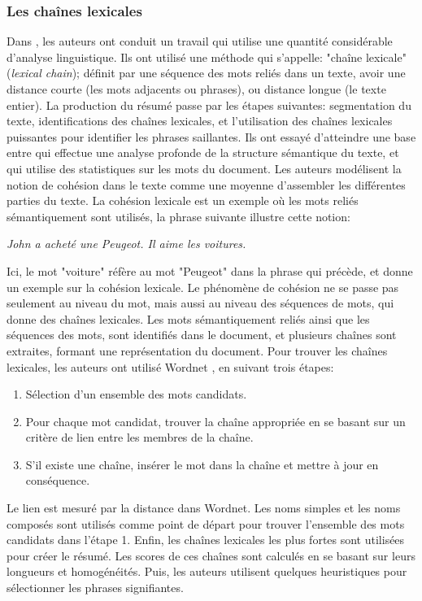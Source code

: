 \documentclass[a4paper,12pt,oneside]{../use/ESIthesis}
\begin{document}
\subsubsection{Les chaînes lexicales}

Dans \cite{97-barzilay-elhadad}, les auteurs ont conduit un travail qui utilise une quantité considérable d'analyse linguistique. 
Ils ont utilisé une méthode qui s'appelle: "chaîne lexicale" (\textit{lexical chain}); définit par une séquence des mots reliés dans un texte, avoir une distance courte (les mots adjacents ou phrases), ou distance longue (le texte entier). 
La production du résumé passe par les étapes suivantes: segmentation du texte, identifications des chaînes lexicales, et l'utilisation des chaînes lexicales puissantes pour identifier les phrases saillantes. 
Ils ont essayé d'atteindre une base entre \cite{95-mckeown-radev} qui effectue une analyse profonde de la structure sémantique du texte, et \cite{58-luhn} qui utilise des statistiques sur les mots du document. 
Les auteurs modélisent la notion de cohésion dans le texte comme une moyenne d'assembler les différentes parties du texte. 
La cohésion lexicale est un exemple où les mots reliés sémantiquement sont utilisés, la phrase suivante illustre cette notion:
\begin{center}
\textit{John a acheté une Peugeot. Il aime les voitures.}
\end{center}
Ici, le mot "voiture" réfère au mot "Peugeot" dans la phrase qui précède, et donne un exemple sur la cohésion lexicale. 
Le phénomène de cohésion ne se passe pas seulement au niveau du mot, mais aussi au niveau des séquences de mots, qui donne des chaînes lexicales. 
Les mots sémantiquement reliés ainsi que les séquences des mots, sont identifiés dans le document, et plusieurs chaînes sont extraites, formant une représentation du document. 
Pour trouver les chaînes lexicales, les auteurs ont utilisé Wordnet \cite{95-miller}, en suivant trois étapes:
\begin{enumerate}
\item Sélection d'un ensemble des mots candidats.
\item Pour chaque mot candidat, trouver la chaîne appropriée en se basant sur un critère de lien entre les membres de la chaîne.
\item S'il existe une chaîne, insérer le mot dans la chaîne et mettre à jour en conséquence.
\end{enumerate}

Le lien est mesuré par la distance dans Wordnet. 
Les noms simples et les noms composés sont utilisés comme point de départ pour trouver l'ensemble des mots candidats dans l'étape 1. 
Enfin, les chaînes lexicales les plus fortes sont utilisées pour créer le résumé. 
Les scores de ces chaînes sont calculés en se basant sur leurs longueurs et homogénéités. 
Puis, les auteurs utilisent quelques heuristiques pour sélectionner les phrases signifiantes. 
\end{document}
